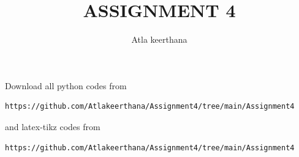 \documentclass[journal,12pt,twocolumn]{IEEEtran}
\begin{document}
%


\newtheorem{theorem}{Theorem}[section]
\newtheorem{problem}{Problem}
\newtheorem{proposition}{Proposition}[section]
\newtheorem{lemma}{Lemma}[section]
\newtheorem{corollary}[theorem]{Corollary}
\newtheorem{example}{Example}[section]
\newtheorem{definition}[problem]{Definition}
\newcommand{\BEQA}{\begin{eqnarray}}
\newcommand{\EEQA}{\end{eqnarray}}
\newcommand{\define}{\stackrel{\triangle}{=}}

\providecommand{\mbf}{\mathbf}
\providecommand{\pr}[1]{\ensuremath{\Pr\left(#1\right)}}
\providecommand{\qfunc}[1]{\ensuremath{Q\left(#1\right)}}
\providecommand{\sbrak}[1]{\ensuremath{{}\left[#1\right]}}
\providecommand{\lsbrak}[1]{\ensuremath{{}\left[#1\right.}}
\providecommand{\rsbrak}[1]{\ensuremath{{}\left.#1\right]}}
\providecommand{\brak}[1]{\ensuremath{\left(#1\right)}}
\providecommand{\lbrak}[1]{\ensuremath{\left(#1\right.}}
\providecommand{\rbrak}[1]{\ensuremath{\left.#1\right)}}
\providecommand{\cbrak}[1]{\ensuremath{\left\{#1\right\}}}
\providecommand{\lcbrak}[1]{\ensuremath{\left\{#1\right.}}
\providecommand{\rcbrak}[1]{\ensuremath{\left.#1\right\}}}
\theoremstyle{remark}
\newtheorem{rem}{Remark}
\newcommand{\sgn}{\mathop{\mathrm{sgn}}}
\providecommand{\abs}[1]{\left\vert#1\right\vert}
\providecommand{\res}[1]{\Res\displaylimits_{#1}} 
\providecommand{\norm}[1]{\left\lVert#1\right\rVert}
\providecommand{\mtx}[1]{\mathbf{#1}}
\providecommand{\mean}[1]{E\left[ #1 \right]}
\providecommand{\fourier}{\overset{\mathcal{F}}{ \rightleftharpoons}}
\providecommand{\system}{\overset{\mathcal{H}}{ \longleftrightarrow}}
\newcommand{\myvec}[1]{\ensuremath{\begin{pmatrix}#1\end{pmatrix}}}
\newcommand{\cmyvec}[1]{\ensuremath{\begin{pmatrix*}[c]#1\end{pmatrix*}}}
\newcommand{\mydet}[1]{\ensuremath{\begin{vmatrix}#1\end{vmatrix}}}
\newcommand{\proj}[2]{\textbf{proj}_{\vec{#1}}\vec{#2}}
\let\StandardTheFigure\thefigure
\let\vec\mathbf
\title{
ASSIGNMENT 4
}
\author{Atla keerthana}
	
\maketitle
\renewcommand{\thefigure}{\theenumi}
\renewcommand{\thetable}{\theenumi}
  Download all python codes from 
\begin{lstlisting}
https://github.com/Atlakeerthana/Assignment4/tree/main/Assignment4
\end{lstlisting}
%
and latex-tikz codes from 
%
\begin{lstlisting}
https://github.com/Atlakeerthana/Assignment4/tree/main/Assignment4
\end{lstlisting}
%
\end{document}

